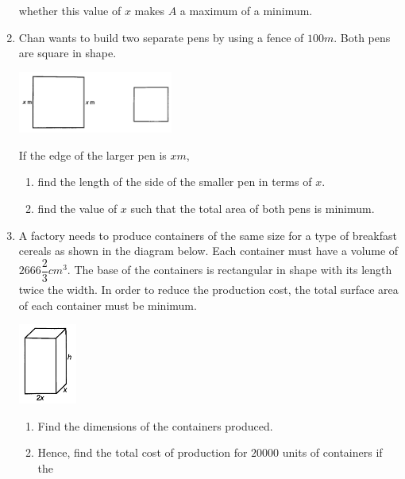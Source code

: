 \documentclass{report}
\begin{document}
\begin{multicols}{2}
\begin{enumerate}
                  whether this value of $x$ makes $A$ a maximum of a minimum.
            \item Chan wants to build two separate pens by using a fence of $100\textit{m}$. Both
                  pens are square in shape.
                  \begin{center}
                        \includegraphics[width=0.4\textwidth]{./images/q30_2.jpeg}
                  \end{center}
                  If the edge of the larger pen is $x\textit{m}$,
                  \begin{enumerate}
                        \item find the length of the side of the smaller pen in terms of $x$.
                        \item find the value of $x$ such that the total area of both pens is minimum.
                  \end{enumerate}
            \item A factory needs to produce containers of the same size for a type of breakfast
                  cereals as shown in the diagram below. Each container must have a volume of
                  $2666\dfrac{2}{3}\textit{cm}^3$. The base of the containers is rectangular in
                  shape with its length twice the width. In order to reduce the production cost,
                  the total surface area of each container must be minimum.
                  \begin{center}
                        \includegraphics[width=0.15\textwidth]{./images/k2q7.jpeg}
                  \end{center}
                  \begin{enumerate}
                        \item Find the dimensions of the containers produced.
                        \item Hence, find the total cost of production for $20000$ units of containers if the

\end{enumerate}
\end{enumerate}
\end{multicols}
\end{document}
